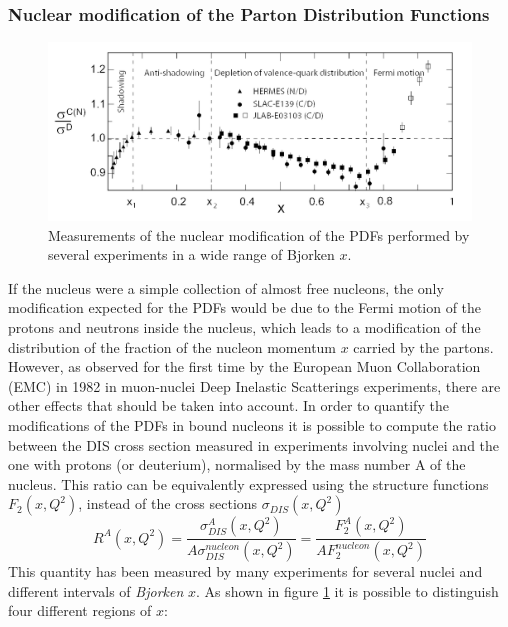 \documentclass[b5paper,10pt,twoside,oldstyle,classica]{toptesi}
\begin{document}
\subsubsection{Nuclear modification of the Parton Distribution Functions}
\begin{figure}[tb]
\begin{center}
\includegraphics[scale = 0.22]{PDF_nuclear_2.png}
\caption{Measurements of the nuclear modification of the PDFs performed by several experiments in a wide range of Bjorken $x$.}
\end{center}
\label{nPDFs}
\end{figure}
If the nucleus were a simple collection of almost free nucleons, the only modification expected for the PDFs would be due to the Fermi motion of the protons and neutrons inside the nucleus, which leads to a modification of the distribution of the fraction of the nucleon momentum $x$ carried by the partons. However, as observed for the first time by the European Muon Collaboration (EMC) in 1982 in muon-nuclei Deep Inelastic Scatterings experiments, there are other effects that should be taken into account. In order to quantify the modifications of the PDFs in bound nucleons it is possible to compute the ratio between the DIS cross section measured in experiments involving nuclei and the one with protons (or deuterium), normalised by the mass number A of the nucleus. This ratio can be equivalently expressed using the structure functions $F_2(x,Q^2)$, instead of the cross sections $\sigma_{DIS} (x,Q^2)$ 
\begin{equation}
 R^{A}(x,Q^2) = \frac{\sigma_{DIS}^A(x,Q^2)}{A\sigma_{DIS}^{nucleon}(x,Q^2)} = \frac{F_2^A(x,Q^2)}{AF_2^{nucleon}(x,Q^2)}
\end{equation}
This quantity has been measured by many experiments for several nuclei and different intervals of \textit{Bjorken} $x$. As shown in figure \ref{nPDFs} it is possible to distinguish four different regions of $x$:
\end{document}
